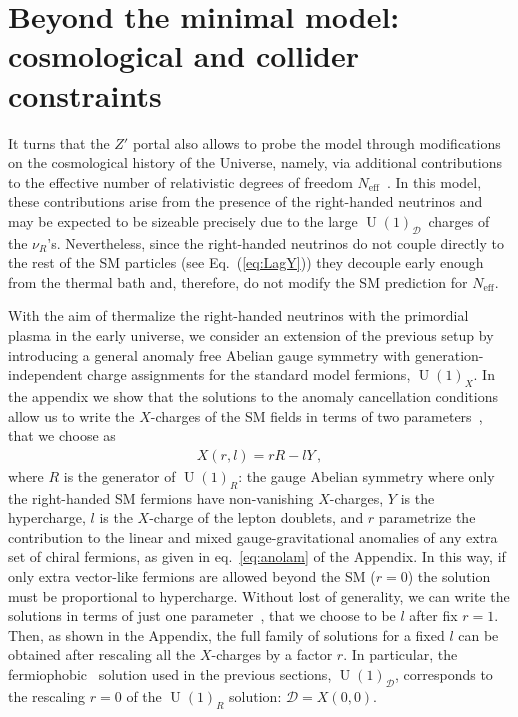 \documentclass[12pt]{article}
\begin{document}

\section{Beyond the minimal model: cosmological and collider constraints}
\label{sec:CosmoConstraints}
It turns that the $Z'$ portal also allows to probe the model through modifications on the cosmological history of the Universe, namely, via additional contributions to the effective number of relativistic degrees of freedom $N_{\text{eff}}$~\cite{Dolgov:2002wy}. In this model, these contributions arise from the presence of the right-handed neutrinos and may be expected to be sizeable precisely due to the large $\operatorname{U}(1)_{\mathcal{D}}$~charges of the $\nu_R$'s.  Nevertheless, since the right-handed neutrinos do not couple directly to the rest of the SM particles (see Eq.~(\ref{eq:LagY}))  they  decouple early enough from the thermal bath and, therefore, do not modify the SM prediction for $N_{\text{eff}}$.

With the aim of thermalize the right-handed neutrinos with the
primordial plasma in the early universe, we consider an extension of
the previous setup by introducing a general anomaly free Abelian gauge
symmetry with generation-independent charge assignments for the
standard model fermions, $\operatorname{U}(1)_{X}$.
% 
In the appendix we show that the solutions to the anomaly cancellation conditions
allow us to write the $X$-charges of the SM fields in terms
of two parameters~\cite{Appelquist:2002mw,Campos:2017dgc}, that we choose as
\begin{align}
  X(r,l)=r R - l Y\,,
\end{align}
where $R$ is the generator of $\operatorname{U}(1)_R$: the gauge Abelian symmetry where only the right-handed SM fermions have non-vanishing $X$-charges, $Y$ is the hypercharge, $l$ is the $X$-charge of the lepton doublets, and $r$ parametrize the contribution to the linear and mixed gauge-gravitational anomalies of any extra set of chiral fermions, as given in eq.~\eqref{eq:anolam} of the Appendix.
In this way, if only extra vector-like fermions are allowed beyond the SM ($r=0$) the solution must be proportional to hypercharge.
%
Without lost of generality, we can write the solutions in terms of just one parameter~\cite{Jenkins:1987ue,Oda:2015gna,Okada:2018tgy}, that we choose to be $l$  after fix $r=1$. Then, as shown in the Appendix, the full family of solutions for a fixed $l$ can be obtained after  rescaling all the $X$-charges by a factor $r$. In particular, the fermiophobic~\cite{Campos:2017dgc,Bertuzzo:2018itn,Bertuzzo:2018ftf} solution used in the previous sections, $\operatorname{U}(1)_{\mathcal{D}}$, corresponds to the rescaling $r=0$ of the $\operatorname{U}(1)_R$ solution: $\mathcal{D}=X(0,0)$. 
\end{document}
